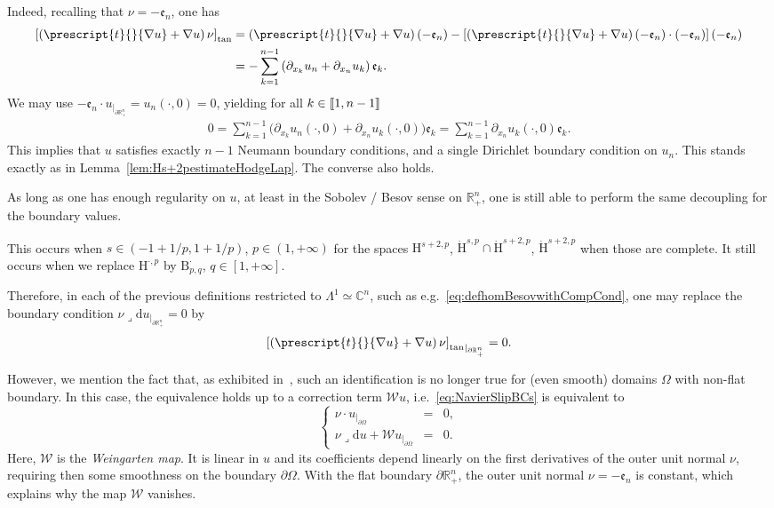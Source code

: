 \documentclass[AHL,Unicode,longabstracts,published]{cedram}
\newcommand{\bbR}{\mathbb{R}}
\newcommand{\bbC}{\mathbb{C}}
\newcommand{\rmH}{\mathrm{H}}%
\newcommand{\rmB}{\mathrm{B}}
\newcommand{\rmd}{\mathrm{d}}
\newcommand{\rtan}{\mathrm{tan}}
\newcommand{\fke}{\mathfrak{e}}
\newcommand{\llbracket}{\mathopen{[\mkern -2.7mu[}}
\newcommand{\rrbracket}{\mathclose{]\mkern -2.7mu]}}
\newcommand{\llb}{\llbracket}
\newcommand{\rrb}{\rrbracket}
\newcommand{\iprod}{\mathbin{\lrcorner}}
\begin{document}
Indeed, recalling that $\nu = -\fke _n$, one has
\begin{align*}
{\left[ \left(\prescript{t}{}{{\nabla u}} + \nabla u\right)\nu \right]_{\rtan}} &= \left(\prescript{t}{}{{\nabla u}} + \nabla u\right)(-\fke _n) - \left[\left(\prescript{t}{}{{\nabla u}} + \nabla u\right)(-\fke _n)\cdot (-\fke _n)\right](-\fke _n)\\
&= -\sum_{k=1}^{n-1} \left(\partial_{x_k}u_n + \partial_{x_n}u_k\right)\fke _k.
\end{align*}
We may use $ -\fke _n \cdot u_{|_{\partial\bbR^n_+}} = u_n(\cdot,0) = 0$, yielding for all $k\in\llb 1,n-1\rrb$
\begin{align*}
0=\sum_{k=1}^{n-1} \big(\partial_{x_k}u_n(\cdot,0) + \partial_{x_n}u_k(\cdot,0)\big)\fke _k = \sum_{k=1}^{n-1} \partial_{x_n}u_k(\cdot,0)\fke _k .
\end{align*}
This implies that $u$ satisfies exactly $n-1$ Neumann boundary conditions, and a single Dirichlet boundary condition on $u_n$. This stands exactly as in Lemma~\ref{lem:Hs+2pestimateHodgeLap}. The converse also holds.

As long as one has enough regularity on $u$, at least in the Sobolev / Besov sense on $\bbR^n_+$, one is still able to perform the same decoupling for the boundary values.

This occurs when $s\in(-1+1/p,1+1/p)$, $p\in(1,+\infty)$ for the spaces $\rmH^{s+2,p}$, $\dot{\rmH}^{s,p}\cap\dot{\rmH}^{s+2,p}$, $\dot{\rmH}^{s+2,p}$ when those are complete. It still occurs when we replace ${\rmH}^{\cdot,p}$ by ${\rmB}^{\cdot}_{p,q}$, $q\in[1,+\infty]$.

Therefore, in each of the previous definitions restricted to $\Lambda^1\simeq\bbC^n$, such as e.g.~\eqref{eq:defhomBesovwithCompCond}, one may replace the boundary condition $\nu\iprod \rmd u_{|_{\partial\bbR^n_+}} =0$ by
\[
{\left[\left(\prescript{t}{}{{\nabla u}} + \nabla u\right)\nu \right]_{\rtan}}_{|_{\partial\bbR^n_+}}=0.
\]

However, we mention the fact that, as exhibited in~\cite[Section~2]{MitreaMonniaux2009-1}, such an identification is no longer true for (even smooth) domains $\Omega$ with non-flat boundary. In this case, the equivalence holds up to a correction term $\mathcal{W}u$, i.e.~\eqref{eq:NavierSlipBCs} is equivalent to
\begin{equation*}
\left\{
\begin{array}{rcl}
\nu \cdot u_{|_{\partial\Omega}}& = & 0,\\
\nu \iprod \rmd u + \mathcal{W}u_{|_{\partial\Omega}} & = & 0.
\end{array}
\right.
\end{equation*}
Here, $\mathcal{W}$ is the \emph{Weingarten map}. It is linear in $u$ and its coefficients depend linearly on the first derivatives of the outer unit normal $\nu$, requiring then some smoothness on the boundary $\partial\Omega$. With the flat boundary $\partial\bbR^n_+$, the outer unit normal $\nu=-\fke _n$ is constant, which explains why the map $\mathcal{W}$ vanishes.
\end{document}
